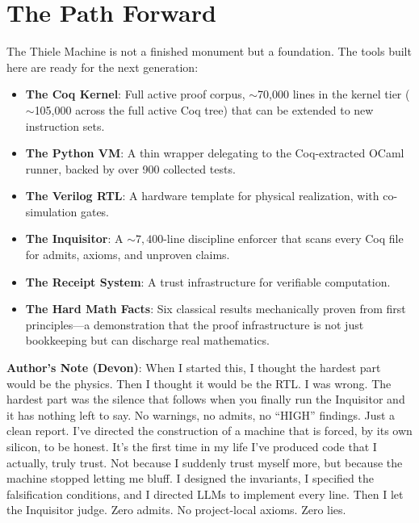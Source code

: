 \section{The Path Forward}

The Thiele Machine is not a finished monument but a foundation. The tools built here are ready for the next generation:

\begin{itemize}
    \item \textbf{The Coq Kernel}: Full active proof corpus, $\sim$70,000 lines in the kernel tier ($\sim$105,000 across the full active Coq tree) that can be extended to new instruction sets.
    \item \textbf{The Python VM}: A thin wrapper delegating to the Coq-extracted OCaml runner, backed by over 900 collected tests.
    \item \textbf{The Verilog RTL}: A hardware template for physical realization, with co-simulation gates.
    \item \textbf{The Inquisitor}: A ${\sim}7{,}400$-line discipline enforcer that scans every Coq file for admits, axioms, and unproven claims.
    \item \textbf{The Receipt System}: A trust infrastructure for verifiable computation.
    \item \textbf{The Hard Math Facts}: Six classical results mechanically proven from first principles---a demonstration that the proof infrastructure is not just bookkeeping but can discharge real mathematics.
\end{itemize}

\begin{center}
\textbf{Author's Note (Devon)}: When I started this, I thought the hardest part would be the physics. Then I thought it would be the RTL. I was wrong. The hardest part was the silence that follows when you finally run the Inquisitor and it has nothing left to say. No warnings, no admits, no ``HIGH'' findings. Just a clean report. I've directed the construction of a machine that is forced, by its own silicon, to be honest. It's the first time in my life I've produced code that I actually, truly trust. Not because I suddenly trust myself more, but because the machine stopped letting me bluff. I designed the invariants, I specified the falsification conditions, and I directed LLMs to implement every line. Then I let the Inquisitor judge. Zero admits. No project-local axioms. Zero lies.
\end{center}

